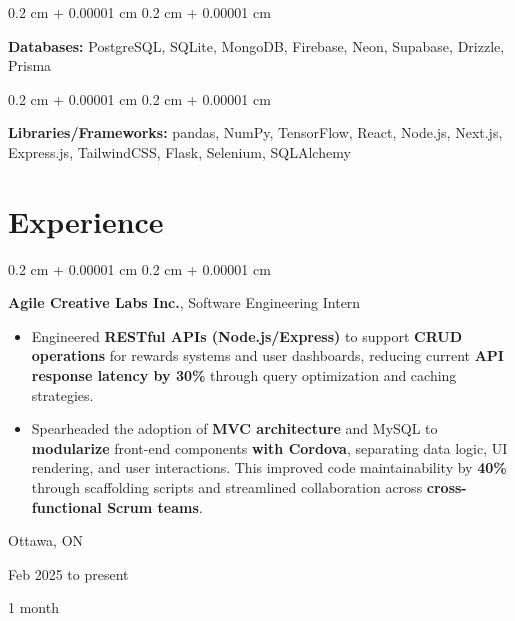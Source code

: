 \documentclass[10pt, letterpaper]{article}
\newenvironment{highlights}{
    \begin{itemize}[
        topsep=0.10 cm,
        parsep=0.10 cm,
        partopsep=0pt,
        itemsep=0pt,
        leftmargin=0.4 cm + 10pt
    ]
}{
    \end{itemize}
} %
\newenvironment{onecolentry}{
    \begin{adjustwidth}{
        0.2 cm + 0.00001 cm
    }{
        0.2 cm + 0.00001 cm
    }
}{
    \end{adjustwidth}
} %
\newenvironment{twocolentry}[2][]{
    \onecolentry
    \def\secondColumn{#2}
    \setcolumnwidth{\fill, 2.5 cm}
    \begin{paracol}{2}
}{
    \switchcolumn \raggedleft \secondColumn
    \end{paracol}
    \endonecolentry
} %
\begin{document}
        \vspace{0.05 cm}

        \begin{onecolentry}
            \textbf{Databases:} PostgreSQL, SQLite, MongoDB, Firebase, Neon, Supabase, Drizzle, Prisma
        \end{onecolentry}

        \vspace{0.05 cm}

        \begin{onecolentry}
            \textbf{Libraries/Frameworks:} pandas, NumPy, TensorFlow, React, Node.js, Next.js, Express.js, TailwindCSS, Flask, Selenium, SQLAlchemy
        \end{onecolentry}


    
    \section{Experience}



        
        \begin{twocolentry}{
            Ottawa, ON

        Feb 2025 to present

        1 month
        }
            \textbf{Agile Creative Labs Inc.}, Software Engineering Intern
            \begin{highlights}
                \item Engineered \textbf{RESTful APIs (Node.js/Express)} to support \textbf{CRUD operations} for rewards systems and user dashboards, reducing current \textbf{API response latency by 30\%} through query optimization and caching strategies.
                \item Spearheaded the adoption of \textbf{MVC architecture} and MySQL to \textbf{modularize} front-end components \textbf{with Cordova}, separating data logic, UI rendering, and user interactions. This improved code maintainability by \textbf{40\%} through scaffolding scripts and streamlined collaboration across \textbf{cross-functional Scrum teams}.
            \end{highlights}
        \end{twocolentry}


        \vspace{0.05 cm}
\end{document}
